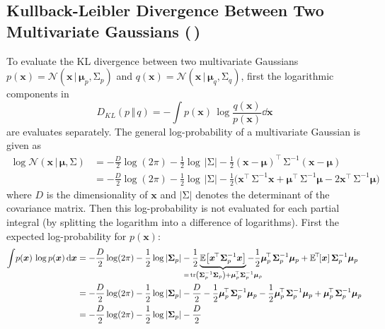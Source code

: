 \documentclass[11pt, a4paper]{scrartcl}
\newcommand{\E}{\mathbb{E}}
\newcommand{\KL}{D_\mathit{KL}}
\newcommand{\transposed}{{\!\top\!}}
\renewcommand{\vec}[1]{\bm{#1}}
\newcommand{\mat}[1]{\bm{\mathrm{#1}}}
\newcommand{\given}{\,\vert\,}
\newcommand{\diffstar}{\texorpdfstring{\raisebox{-1pt}{\resizebox{!}{8pt}{\(\star\)}}}{*}}
\newcommand{\twostar}  {(\diffstar\,\diffstar)}
\begin{document}
		\subsection{Kullback-Leibler Divergence Between Two Multivariate Gaussians  \twostar}
			To evaluate the KL divergence between two multivariate Gaussians \( p(\vec{x}) = \mathcal{N}(\vec{x} \given \vec{\mu}_p, \mat{\Sigma}_p) \) and \( q(\vec{x}) = \mathcal{N}(\vec{x} \given \vec{\mu}_q, \mat{\Sigma}_q) \), first the logarithmic components in
			\begin{equation}
				\KL(p \,\Vert\, q) = -\int\! p(\vec{x}) \, \log \frac{q(\vec{x})}{p(\vec{x})} \dd{\vec{x}}
			\end{equation}
			are evaluates separately. The general log-probability of a multivariate Gaussian is given as
			\begin{align}
				\log \mathcal{N}(\vec{x} \given \vec{\mu}, \mat{\Sigma})
					&= -\frac{D}{2} \log(2\pi) - \frac{1}{2} \log \, \lvert \mat{\Sigma} \rvert - \frac{1}{2} (\vec{x} - \vec{\mu})^\transposed\, \mat{\Sigma}^{-1} (\vec{x} - \vec{\mu}) \\
					&= -\frac{D}{2} \log(2\pi) - \frac{1}{2} \log \, \lvert \mat{\Sigma} \rvert - \frac{1}{2} \big( \vec{x}^\transposed\, \mat{\Sigma}^{-1} \vec{x} + \vec{\mu}^\transposed\, \mat{\Sigma}^{-1} \vec{\mu} - 2 \vec{x}^\transposed\, \mat{\Sigma}^{-1} \vec{\mu} \big)
			\end{align}
			where \(D\) is the dimensionality of \(\vec{x}\) and \( \lvert \mat{\Sigma} \rvert \) denotes the determinant of the covariance matrix. Then this log-probability is not evaluated for each partial integral (by splitting the logarithm into a difference of logarithms). First the expected log-probability for \(p(\vec{x})\):
			\begin{align}
				\int\! p(\vec{x}) \, \log p(\vec{x}) \dd{\vec{x}}
					&= -\frac{D}{2} \log(2\pi) - \frac{1}{2} \log \, \lvert \mat{\Sigma}_p \rvert - \frac{1}{2} \underbrace{\E\big[ \vec{x}^\transposed\, \mat{\Sigma}_p^{-1} \vec{x} \big]}_{\mathclap{=\, \tr(\mat{\Sigma}_p^{-1} \mat{\Sigma}_p) + \vec{\mu}_p^{\transposed\,} \mat{\Sigma}_p^{-1} \vec{\mu}_p}} - \frac{1}{2} \vec{\mu}_p^\transposed\, \mat{\Sigma}_p^{-1} \vec{\mu}_p + \E^\transposed[\vec{x}]\, \mat{\Sigma}_p^{-1} \vec{\mu}_p \\
					&= -\frac{D}{2} \log(2\pi) - \frac{1}{2} \log \, \lvert \mat{\Sigma}_p \rvert - \frac{D}{2} - \frac{1}{2} \vec{\mu}_p^\transposed\, \mat{\Sigma}_p^{-1} \vec{\mu}_p - \frac{1}{2} \vec{\mu}_p^\transposed\, \mat{\Sigma}_p^{-1} \vec{\mu}_p + \vec{\mu}_p^\transposed\, \mat{\Sigma}_p^{-1} \vec{\mu}_p \\
					&= -\frac{D}{2} \log(2\pi) - \frac{1}{2} \log \, \lvert \mat{\Sigma}_p \rvert - \frac{D}{2}  \label{eq:2-13-entropy}
			\end{align}
\end{document}
